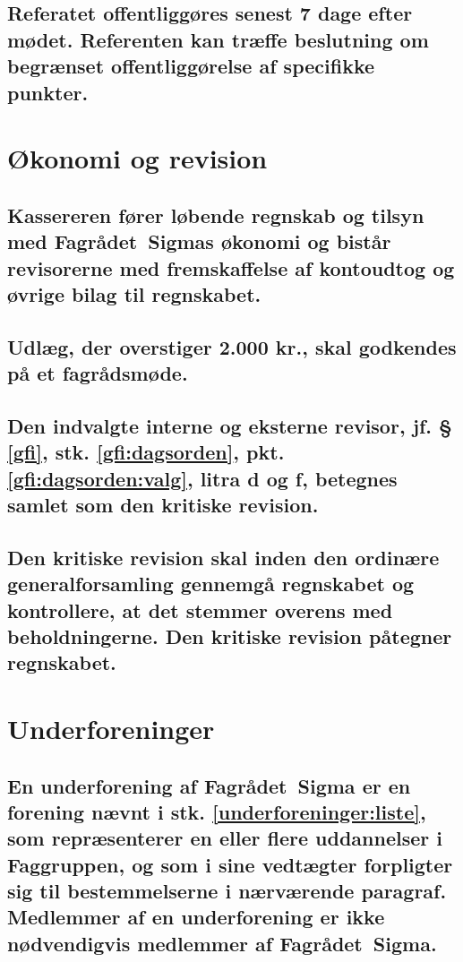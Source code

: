 \documentclass[10pt, danish]{article}
\newcommand{\fagr}{Fagrådet~Sigma}
\begin{document}
	\subsection{Referatet offentliggøres senest 7 dage efter mødet. Referenten kan træffe beslutning om begrænset offentliggørelse af specifikke punkter.}
	
	\section{Økonomi og revision}\label{revision}
	
	\subsection{Kassereren fører løbende regnskab og tilsyn med \fagr{}s økonomi og bistår revisorerne med fremskaffelse af kontoudtog og øvrige bilag til regnskabet.}
	
	\subsection{Udlæg, der overstiger 2.000 kr., skal godkendes på et fagrådsmøde.}
	
        \subsection{Den indvalgte interne og eksterne revisor, jf. § \ref{gfi}, stk. \ref{gfi:dagsorden}, pkt. \ref{gfi:dagsorden:valg}, litra d og f, betegnes samlet som den kritiske revision.}
	
	\subsection{Den kritiske revision skal inden den ordinære generalforsamling gennemgå regnskabet og kontrollere, at det stemmer overens med beholdningerne. Den kritiske revision påtegner regnskabet.}\label{revision:kritiske}
	
	\section{Underforeninger}\label{underforeninger}
	
	\subsection{En underforening af \fagr{} er en forening nævnt i stk. \ref{underforeninger:liste}, som repræsenterer en eller flere uddannelser i Faggruppen, og som i sine vedtægter forpligter sig til bestemmelserne i nærværende paragraf. Medlemmer af en underforening er ikke nødvendigvis medlemmer af \fagr{}.}
	
\end{document}
